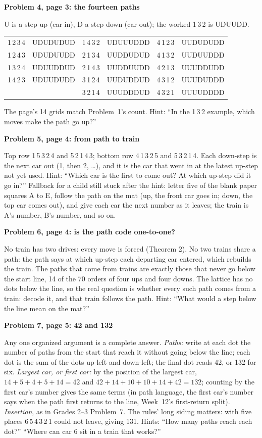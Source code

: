 \documentclass[11pt]{article}
\newcommand{\sub}[1]{\par\needspace{3\baselineskip}\textbf{#1}\par\nopagebreak}
\newcommand{\tr}[1]{\mbox{#1}}
\begin{document}
\sub{Problem 4, page 3: the fourteen paths}
U is a step up (car in), D a step down (car out); the worked \tr{1\,3\,2} is UDUUDD.
\begin{center}\small
\begin{tabular}{ll@{\qquad}ll@{\qquad}ll}
\tr{1\,2\,3\,4} & UDUDUDUD & \tr{1\,4\,3\,2} & UDUUUDDD & \tr{4\,1\,2\,3} & UUDUDUDD\\
\tr{1\,2\,4\,3} & UDUDUUDD & \tr{2\,1\,3\,4} & UUDDUDUD & \tr{4\,1\,3\,2} & UUDUUDDD\\
\tr{1\,3\,2\,4} & UDUUDDUD & \tr{2\,1\,4\,3} & UUDDUUDD & \tr{4\,2\,1\,3} & UUUDDUDD\\
\tr{1\,4\,2\,3} & UDUUDUDD & \tr{3\,1\,2\,4} & UUDUDDUD & \tr{4\,3\,1\,2} & UUUDUDDD\\
 & & \tr{3\,2\,1\,4} & UUUDDDUD & \tr{4\,3\,2\,1} & UUUUDDDD
\end{tabular}\end{center}
The page's 14 grids match Problem~1's count. Hint: ``In the \tr{1\,3\,2} example, which moves make the path go up?''

\sub{Problem 5, page 4: from path to train}
Top row \tr{1\,5\,3\,2\,4} and \tr{5\,2\,1\,4\,3}; bottom row \tr{4\,1\,3\,2\,5} and \tr{5\,3\,2\,1\,4}. Each down-step is the next car out (1, then 2, \dots), and it is the car that went in at the latest up-step not yet used. Hint: ``Which car is the first to come out? At which up-step did it go in?'' Fallback for a child still stuck after the hint: letter five of the blank paper squares A to E, follow the path on the mat (up, the front car goes in; down, the top car comes out), and give each car the next number as it leaves; the train is A's number, B's number, and so on.

\sub{Problem 6, page 4: is the path code one-to-one?}
No train has two drives: every move is forced (Theorem 2). No two trains share a path: the path says at which up-step each departing car entered, which rebuilds the train. The paths that come from trains are exactly those that never go below the start line, 14 of the 70 orders of four ups and four downs. The lattice has no dots below the line, so the real question is whether every such path comes from a train: decode it, and that train follows the path. Hint: ``What would a step below the line mean on the mat?''

\sub{Problem 7, page 5: 42 and 132}
Any one organized argument is a complete answer. \emph{Paths:} write at each dot the number of paths from the start that reach it without going below the line; each dot is the sum of the dots up-left and down-left; the final dot reads 42, or 132 for six. \emph{Largest car, or first car:} by the position of the largest car, $14+5+4+5+14=42$ and $42+14+10+10+14+42=132$; counting by the first car's number gives the same terms (in path language, the first car's number says when the path first returns to the line, Week~12's first-return split). \emph{Insertion}, as in Grades 2--3 Problem~7. The rules' long siding matters: with five places \tr{6\,5\,4\,3\,2\,1} could not leave, giving 131. Hints: ``How many paths reach each dot?'' ``Where can car 6 sit in a train that works?''
\end{document}
